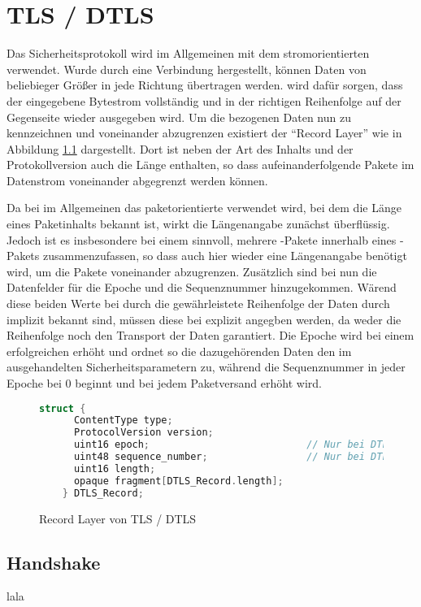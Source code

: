 \chapter{TLS / DTLS}

Das Sicherheitsprotokoll  wird im Allgemeinen mit dem stromorientierten  verwendet.
Wurde durch  eine Verbindung hergestellt, können Daten von beliebieger Größer in jede Richtung
übertragen werden.  wird dafür sorgen, dass der eingegebene Bytestrom vollständig und in der
richtigen Reihenfolge auf der Gegenseite wieder ausgegeben wird. Um die  bezogenen Daten nun
zu kennzeichnen und voneinander abzugrenzen existiert der "`Record Layer"' wie in Abbildung \ref{fig:recordlayer}
dargestellt.  Dort ist neben der Art des Inhalts und der Protokollversion auch
die Länge enthalten, so dass aufeinanderfolgende Pakete im Datenstrom voneinander abgegrenzt werden können.

Da bei  im Allgemeinen das paketorientierte  verwendet wird, bei dem die Länge eines
Paketinhalts bekannt ist, wirkt die Längenangabe zunächst überflüssig. Jedoch ist es insbesondere bei einem
 sinnvoll, mehrere -Pakete innerhalb eines -Pakets zusammenzufassen,
so dass auch hier wieder eine Längenangabe benötigt wird, um die Pakete voneinander abzugrenzen.
Zusätzlich sind bei  nun die Datenfelder für die Epoche und die Sequenznummer hinzugekommen.
Wärend diese beiden Werte bei  durch die gewährleistete Reihenfolge der Daten durch 
implizit bekannt sind, müssen diese bei  explizit angegben werden, da  weder die
Reihenfolge noch den Transport der Daten garantiert. Die Epoche wird bei einem erfolgreichen 
erhöht und ordnet so die dazugehörenden Daten den im  ausgehandelten Sicherheitsparametern zu,
während die Sequenznummer in jeder Epoche bei 0 beginnt und bei jedem Paketversand erhöht wird.

\begin{figure}[ht]
  \centering
  \begin{lstlisting}[language=c]
    struct {
      ContentType type;
      ProtocolVersion version;
      uint16 epoch;                           // Nur bei DTLS
      uint48 sequence_number;                 // Nur bei DTLS
      uint16 length;
      opaque fragment[DTLS_Record.length];
    } DTLS_Record;
  \end{lstlisting}
  \caption{Record Layer von TLS / DTLS}
  \label{fig:recordlayer}
\end{figure}

\section{Handshake}

lala


